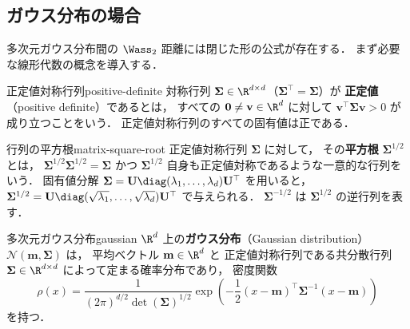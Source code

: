 \subsection{ガウス分布の場合}
\label{subsec:gaussian}

多次元ガウス分布間の $\Wass_2$ 距離には閉じた形の公式が存在する．
まず必要な線形代数の概念を導入する．

\begin{definition}{正定値対称行列}{positive-definite}
  対称行列 $\mathbf{\Sigma} \in \R^{d \times d}$（$\mathbf{\Sigma}^\top = \mathbf{\Sigma}$）が
  \textbf{正定値}（positive definite）であるとは，
  すべての $\mathbf{0} \neq \mathbf{v} \in \R^d$ に対して
  $\mathbf{v}^\top \mathbf{\Sigma} \mathbf{v} > 0$ が成り立つことをいう．
  正定値対称行列のすべての固有値は正である．
\end{definition}

\begin{definition}{行列の平方根}{matrix-square-root}
  正定値対称行列 $\mathbf{\Sigma}$ に対して，
  その\textbf{平方根} $\mathbf{\Sigma}^{1/2}$ とは，
  $\mathbf{\Sigma}^{1/2} \mathbf{\Sigma}^{1/2} = \mathbf{\Sigma}$ かつ
  $\mathbf{\Sigma}^{1/2}$ 自身も正定値対称であるような一意的な行列をいう．
  固有値分解 $\mathbf{\Sigma} = \mathbf{U} \diag(\lambda_1, \ldots, \lambda_d) \mathbf{U}^\top$
  を用いると，$\mathbf{\Sigma}^{1/2} = \mathbf{U} \diag(\sqrt{\lambda_1}, \ldots, \sqrt{\lambda_d}) \mathbf{U}^\top$ で与えられる．
  $\mathbf{\Sigma}^{-1/2}$ は $\mathbf{\Sigma}^{1/2}$ の逆行列を表す．
\end{definition}

\begin{definition}{多次元ガウス分布}{gaussian}
  $\R^d$ 上の\textbf{ガウス分布}（Gaussian distribution）
  $\mathcal{N}(\mathbf{m}, \mathbf{\Sigma})$ は，
  平均ベクトル $\mathbf{m} \in \R^d$ と
  正定値対称行列である共分散行列 $\mathbf{\Sigma} \in \R^{d \times d}$ によって定まる確率分布であり，
  密度関数
  \[
    \rho(x) = \frac{1}{(2\pi)^{d/2} \det(\mathbf{\Sigma})^{1/2}}
    \exp\!\left( -\frac{1}{2} (x - \mathbf{m})^\top \mathbf{\Sigma}^{-1} (x - \mathbf{m}) \right)
  \]
  を持つ．
\end{definition}

